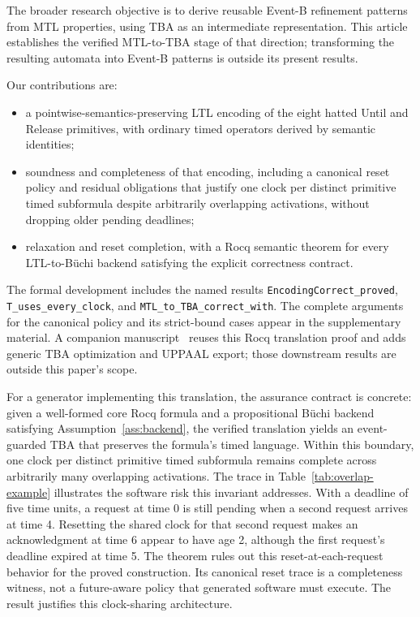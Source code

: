\documentclass[10pt,journal,compsoc]{IEEEtran}
\begin{document}
The broader research objective is to derive reusable Event-B refinement
patterns from MTL properties, using TBA as an intermediate representation.
This article establishes the verified MTL-to-TBA stage of that direction;
transforming the resulting automata into Event-B patterns is outside its
present results.

Our contributions are:
\begin{itemize}
  \item a pointwise-semantics-preserving LTL encoding of the eight
        hatted Until and Release primitives, with ordinary timed operators
        derived by semantic identities;
  \item soundness and completeness of that encoding, including a canonical
        reset policy and residual obligations that justify one clock per
        distinct primitive timed subformula despite arbitrarily overlapping
        activations, without dropping older pending deadlines;
  \item relaxation and reset completion, with a Rocq semantic theorem for
        every LTL-to-B\"uchi backend satisfying the explicit correctness
        contract.
\end{itemize}

The formal development includes the named results
\texttt{EncodingCorrect\_proved}, \texttt{T\_uses\_every\_clock}, and
\texttt{MTL\_to\_TBA\_correct\_with}. The complete arguments for the
canonical policy and its strict-bound cases appear in the supplementary
material. A companion manuscript~\cite{fares_bodeveix_tba_optimization}
reuses this Rocq translation proof and adds generic TBA optimization and
UPPAAL export; those downstream results are outside this paper's scope.

For a generator implementing this translation, the assurance contract is
concrete: given a well-formed core Rocq formula and a propositional B\"uchi
backend satisfying Assumption~\ref{ass:backend}, the verified translation
yields an event-guarded TBA that preserves the formula's timed language.
Within this boundary, one clock per distinct
primitive timed subformula remains complete across arbitrarily many
overlapping activations. The trace in Table~\ref{tab:overlap-example}
illustrates the software risk this invariant addresses. With a deadline of
five time units, a request at time 0 is still pending when a second request
arrives at time 4. Resetting the shared clock for that second request makes an
acknowledgment at time 6 appear to have age 2, although the first request's
deadline expired at time 5. The theorem rules out this reset-at-each-request
behavior for the proved construction. Its canonical reset trace is a
completeness witness, not a future-aware policy that generated software must
execute. The result justifies this clock-sharing architecture.
\end{document}
